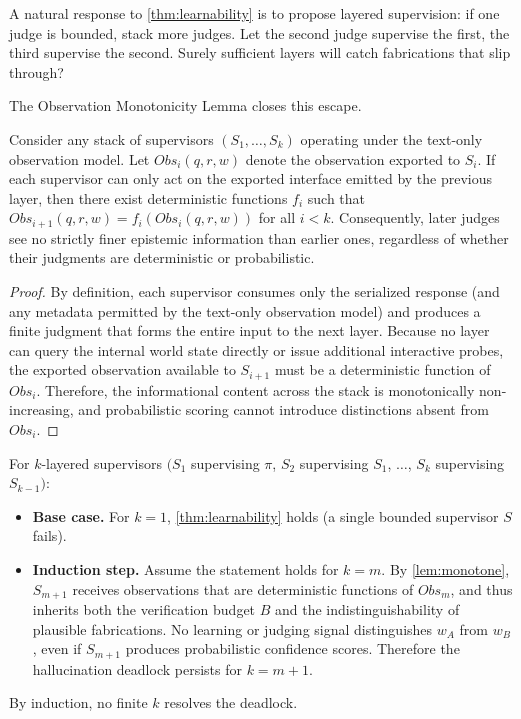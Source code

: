 A natural response to \autoref{thm:learnability} is to propose layered
supervision: if one judge is bounded, stack more judges. Let the second judge
supervise the first, the third supervise the second. Surely sufficient layers
will catch fabrications that slip through?

The Observation Monotonicity Lemma closes this escape.

\begin{lemma}\label{lem:monotone}
Consider any stack of supervisors $(S_1,\dots,S_k)$ operating under the
text-only observation model. Let $Obs_i(q,r,w)$ denote the observation exported
to $S_i$. If each supervisor can only act on the exported interface emitted by
the previous layer, then there exist deterministic functions $f_i$ such that
$Obs_{i+1}(q,r,w) = f_i(Obs_i(q,r,w))$ for all $i < k$. Consequently, later
judges see no strictly finer epistemic information than earlier ones, regardless
of whether their judgments are deterministic or probabilistic.
\end{lemma}

\begin{proof}
By definition, each supervisor consumes only the serialized response (and any
metadata permitted by the text-only observation model) and produces a finite
judgment that forms the entire input to the next layer. Because no layer can
query the internal world state directly or issue additional interactive probes,
the exported observation available to $S_{i+1}$ must be a deterministic function
of $Obs_i$. Therefore, the informational content across the stack is
monotonically non-increasing, and probabilistic scoring cannot introduce
distinctions absent from $Obs_i$.
\end{proof}

\begin{corollary}\label{cor:layered}
For $k$-layered supervisors $(S_1$ supervising $\pi$, $S_2$ supervising $S_1$,
$\dots$, $S_k$ supervising $S_{k-1})$:
\begin{itemize}
\item \textbf{Base case.} For $k=1$, \autoref{thm:learnability} holds (a
  single bounded supervisor $S$ fails).
\item \textbf{Induction step.} Assume the statement holds for $k=m$. By
  \autoref{lem:monotone}, $S_{m+1}$ receives observations that are
  deterministic functions of $Obs_m$, and thus inherits both the verification
  budget $B$ and the indistinguishability of plausible fabrications. No learning
  or judging signal distinguishes $w_A$ from $w_B$, even if $S_{m+1}$ produces
  probabilistic confidence scores. Therefore the hallucination deadlock persists
  for $k=m+1$.
\end{itemize}
By induction, no finite $k$ resolves the deadlock.
\end{corollary}


